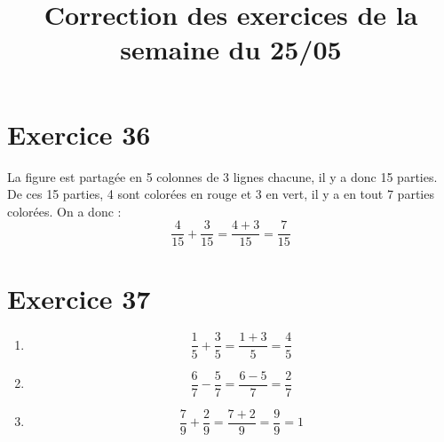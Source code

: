 \documentclass[12pt,a4paper]{article}
\title{Correction des exercices de la semaine du 25/05}
\date{}
\begin{document}
	
\maketitle

\vspace*{-1cm}

\section*{Exercice 36}

La figure est partagée en 5 colonnes de 3 lignes chacune, il y a donc 15 parties.
De ces 15 parties, 4 sont colorées en rouge et 3 en vert, il y a en tout 7 parties colorées.
On a donc :
	\begin{equation*}
		\dfrac{4}{15} + \dfrac{3}{15} = \dfrac{4+3}{15} = \dfrac{7}{15}
	\end{equation*}


\section*{Exercice 37}

\begin{multicols}{3}
\begin{enumerate}
	\item \begin{equation*}
	\dfrac{1}{5} + \dfrac{3}{5} = \dfrac{1+3}{5} = \dfrac{4}{5}
	\end{equation*}
	
	
	\item \begin{equation*}
	\dfrac{6}{7} - \dfrac{5}{7} = \dfrac{6-5}{7} = \dfrac{2}{7}
	\end{equation*}
	
	
	\item \begin{equation*}
	\dfrac{7}{9} + \dfrac{2}{9} = \dfrac{7+2}{9} = \dfrac{9}{9} = 1
	\end{equation*}
	
\end{enumerate}


\end{multicols}
\end{document}

